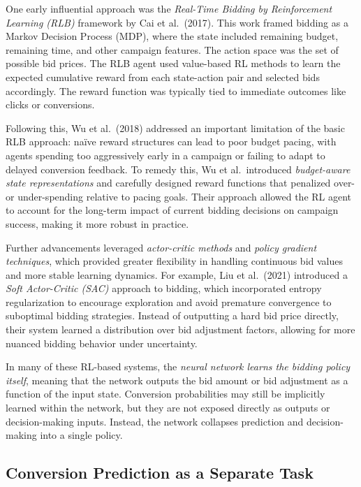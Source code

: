 \documentclass[11pt]{article}
\begin{document}
One early influential approach was the \emph{Real-Time Bidding by Reinforcement Learning (RLB)} framework by Cai et al.\ (2017). This work framed bidding as a Markov Decision Process (MDP), where the state included remaining budget, remaining time, and other campaign features. The action space was the set of possible bid prices. The RLB agent used value-based RL methods to learn the expected cumulative reward from each state-action pair and selected bids accordingly. The reward function was typically tied to immediate outcomes like clicks or conversions.

Following this, Wu et al.\ (2018) addressed an important limitation of the basic RLB approach: naïve reward structures can lead to poor budget pacing, with agents spending too aggressively early in a campaign or failing to adapt to delayed conversion feedback. To remedy this, Wu et al.\ introduced \emph{budget-aware state representations} and carefully designed reward functions that penalized over- or under-spending relative to pacing goals. Their approach allowed the RL agent to account for the long-term impact of current bidding decisions on campaign success, making it more robust in practice.

Further advancements leveraged \emph{actor-critic methods} and \emph{policy gradient techniques}, which provided greater flexibility in handling continuous bid values and more stable learning dynamics. For example, Liu et al.\ (2021) introduced a \emph{Soft Actor-Critic (SAC)} approach to bidding, which incorporated entropy regularization to encourage exploration and avoid premature convergence to suboptimal bidding strategies. Instead of outputting a hard bid price directly, their system learned a distribution over bid adjustment factors, allowing for more nuanced bidding behavior under uncertainty.

In many of these RL-based systems, the \emph{neural network learns the bidding policy itself}, meaning that the network outputs the bid amount or bid adjustment as a function of the input state. Conversion probabilities may still be implicitly learned within the network, but they are not exposed directly as outputs or decision-making inputs. Instead, the network collapses prediction and decision-making into a single policy.

\subsection{Conversion Prediction as a Separate Task}
\end{document}
